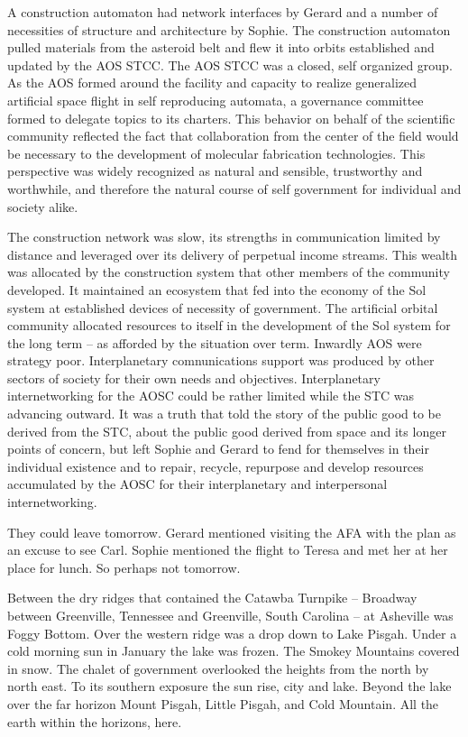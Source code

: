 A construction automaton had network interfaces by Gerard and a number
of necessities of structure and architecture by Sophie.  The
construction automaton pulled materials from the asteroid belt and
flew it into orbits established and updated by the AOS STCC.  The AOS
STCC was a closed, self organized group.  As the AOS formed around the
facility and capacity to realize generalized artificial space flight
in self reproducing automata, a governance committee formed to
delegate topics to its charters.  This behavior on behalf of the
scientific community reflected the fact that collaboration from the
center of the field would be necessary to the development of molecular
fabrication technologies.  This perspective was widely recognized as
natural and sensible, trustworthy and worthwhile, and therefore the
natural course of self government for individual and society alike.

The construction network was slow, its strengths in communication
limited by distance and leveraged over its delivery of perpetual
income streams.  This wealth was allocated by the construction system
that other members of the community developed.  It maintained an
ecosystem that fed into the economy of the Sol system at established
devices of necessity of government.  The artificial orbital community
allocated resources to itself in the development of the Sol system for
the long term -- as afforded by the situation over term.  Inwardly AOS
were strategy poor.  Interplanetary comnunications support was
produced by other sectors of society for their own needs and
objectives.  Interplanetary internetworking for the AOSC could be
rather limited while the STC was advancing outward.  It was a truth
that told the story of the public good to be derived from the STC,
about the public good derived from space and its longer points of
concern, but left Sophie and Gerard to fend for themselves in their
individual existence and to repair, recycle, repurpose and develop
resources accumulated by the AOSC for their interplanetary and
interpersonal internetworking.



They could leave tomorrow.  Gerard mentioned visiting the AFA with the
plan as an excuse to see Carl.  Sophie mentioned the flight to Teresa
and met her at her place for lunch.  So perhaps not tomorrow.



Between the dry ridges that contained the Catawba Turnpike -- Broadway
between Greenville, Tennessee and Greenville, South Carolina -- at
Asheville was Foggy Bottom.  Over the western ridge was a drop down to
Lake Pisgah.  Under a cold morning sun in January the lake was frozen.
The Smokey Mountains covered in snow.  The chalet of government
overlooked the heights from the north by north east.  To its southern
exposure the sun rise, city and lake.  Beyond the lake over the far
horizon Mount Pisgah, Little Pisgah, and Cold Mountain.  All the earth
within the horizons, here.



